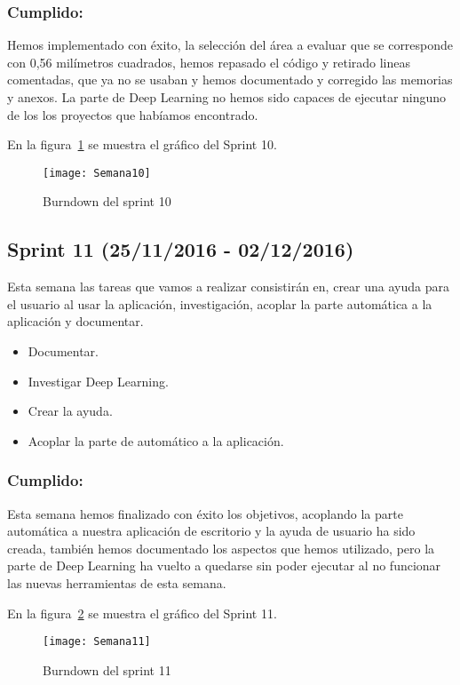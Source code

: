 \subsubsection{Cumplido:}
Hemos implementado con éxito, la selección del área a evaluar que se corresponde con 0,56 milímetros cuadrados, hemos repasado el código y retirado lineas comentadas, que ya no se usaban y hemos documentado y corregido las memorias y anexos.
La parte de Deep Learning no hemos sido capaces de ejecutar ninguno de los los proyectos que habíamos encontrado.

En la figura~\ref{fig:A.2.10} se muestra el gráfico del Sprint 10.

\begin{figure}[h]
\centering
\texttt{[image: Semana10]}
\caption{Burndown del sprint 10}
\label{fig:A.2.10}
\end{figure}

\subsection{Sprint 11 (25/11/2016 - 02/12/2016)}
Esta semana las tareas que vamos a realizar consistirán en, crear una ayuda para el usuario al usar la aplicación, investigación, acoplar la parte automática a la aplicación y documentar.
\begin{itemize}
	\item Documentar.
	\item Investigar Deep Learning.
	\item Crear la ayuda.
	\item Acoplar la parte de automático a la aplicación.
\end{itemize}

\subsubsection{Cumplido:}
Esta semana hemos finalizado con éxito los objetivos, acoplando la parte automática a nuestra aplicación de escritorio y la ayuda de usuario ha sido creada, también hemos documentado los aspectos que hemos utilizado, pero la parte de Deep Learning ha vuelto a quedarse sin poder ejecutar al no funcionar las nuevas herramientas de esta semana.

En la figura~\ref{fig:A.2.11} se muestra el gráfico del Sprint 11.

\begin{figure}[h]
\centering
\texttt{[image: Semana11]}
\caption{Burndown del sprint 11}
\label{fig:A.2.11}
\end{figure}


